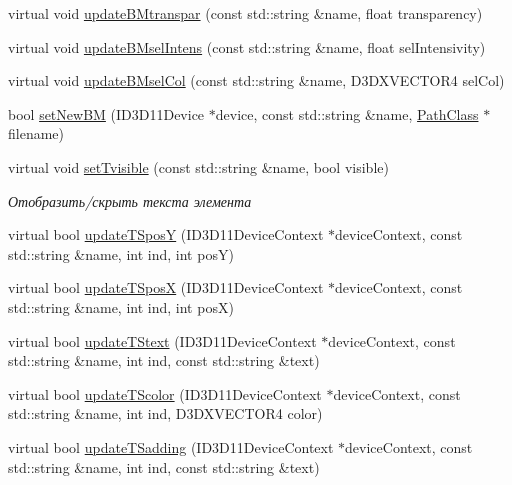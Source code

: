 \begin{DoxyCompactItemize}
\item 
virtual void \hyperlink{class_interface_element_class_adecf79076fdb4192adab5f74239b6b62}{update\+B\+Mtranspar} (const std\+::string \&name, float transparency)
\item 
virtual void \hyperlink{class_interface_element_class_a3855f9b8395a0d7571ebf86a55596ffa}{update\+B\+Msel\+Intens} (const std\+::string \&name, float sel\+Intensivity)
\item 
virtual void \hyperlink{class_interface_element_class_acd05ce4f703284b47bbfe6abb7a5026c}{update\+B\+Msel\+Col} (const std\+::string \&name, D3\+D\+X\+V\+E\+C\+T\+O\+R4 sel\+Col)
\item 
bool \hyperlink{class_interface_element_class_a91cdf8dd0c4ca5ec1a51588572ac07d4}{set\+New\+BM} (I\+D3\+D11\+Device $\ast$device, const std\+::string \&name, \hyperlink{class_path_class}{Path\+Class} $\ast$filename)
\item 
virtual void \hyperlink{class_interface_element_class_afbfd6e575119dee8d3bbca739354754e}{set\+Tvisible} (const std\+::string \&name, bool visible)
\begin{DoxyCompactList}\small\item\em Отобразить/скрыть текста элемента \end{DoxyCompactList}\item 
virtual bool \hyperlink{class_interface_element_class_afa2b0141aaaad7223ef087627aaa8570}{update\+T\+SposY} (I\+D3\+D11\+Device\+Context $\ast$device\+Context, const std\+::string \&name, int ind, int posY)
\item 
virtual bool \hyperlink{class_interface_element_class_a662b70e734c36fb0b792b7f9d8ab4eb1}{update\+T\+SposX} (I\+D3\+D11\+Device\+Context $\ast$device\+Context, const std\+::string \&name, int ind, int posX)
\item 
virtual bool \hyperlink{class_interface_element_class_a0cc96e120484d53c600515fefda32945}{update\+T\+Stext} (I\+D3\+D11\+Device\+Context $\ast$device\+Context, const std\+::string \&name, int ind, const std\+::string \&text)
\item 
virtual bool \hyperlink{class_interface_element_class_aceae624832991064f6b6e6f363911a5b}{update\+T\+Scolor} (I\+D3\+D11\+Device\+Context $\ast$device\+Context, const std\+::string \&name, int ind, D3\+D\+X\+V\+E\+C\+T\+O\+R4 color)
\item 
virtual bool \hyperlink{class_interface_element_class_ae505d58cae330457c8b5bbdd23bb644f}{update\+T\+Sadding} (I\+D3\+D11\+Device\+Context $\ast$device\+Context, const std\+::string \&name, int ind, const std\+::string \&text)

\end{DoxyCompactItemize}
